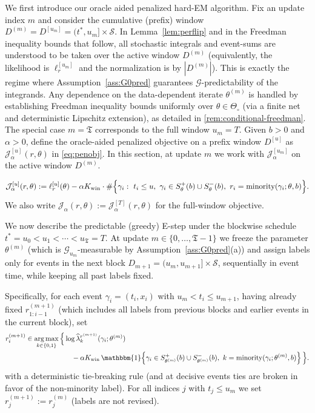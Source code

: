 \documentclass{statsoc}
\newcommand{\1}{\mathbbm{1}}
\newcommand{\Tmax}{\mathfrak{T}}
\DeclareMathOperator*{\argmax}{arg\,max}
\begin{document}
We first introduce our oracle aided penalized hard-EM algorithm. Fix an update index $m$ and consider the cumulative (prefix) window $D^{(m)}=D^{[u_m]}=(t^\ast,u_m]\times\mathcal S$. In Lemma~\ref{lem:perflip} and in the Freedman inequality bounds that follow, all stochastic integrals and event-sums are
understood to be taken over the active window $D^{(m)}$ (equivalently, the likelihood is $\ell_r^{[u_m]}$ and the
normalization is by $|D^{(m)}|$).
This is exactly the regime where Assumption~\ref{ass:G0pred} guarantees $\mathcal G$-predictability of the integrands. Any dependence on the data-dependent iterate $\theta^{(m)}$ is handled by establishing Freedman inequality bounds uniformly over $\theta\in\Theta_\circ$ (via a finite net and deterministic Lipschitz extension), as detailed in \cref{rem:conditional-freedman}. The special case $m=\Tmax$ corresponds to the full window $u_m=T$. Given $b>0$ and $\alpha>0$, define the oracle-aided penalized objective on a prefix window $D^{[u]}$ as $\mathcal J_\alpha^{[u]}(r,\theta)$ in \eqref{eq:penobj}. In this section, at update $m$ we work with $\mathcal J_\alpha^{[u_m]}$ on the active window $D^{(m)}$.


\begin{equation}\label{eq:penobj}
\mathcal J_\alpha^{[u]}(r,\theta)
:=\ell_r^{[u]}(\theta)
-\alpha K_{\rm win}\cdot
\#\Big\{\gamma_i:\ t_i\le u,\ \gamma_i\in S_\theta^+(b)\cup S_\theta^-(b),\ r_i=\text{minority}(\gamma_i;\theta,b)\Big\}.
\end{equation}
We also write $\mathcal J_\alpha(r,\theta):=\mathcal J_\alpha^{[T]}(r,\theta)$ for the full-window objective.

We now describe the predictable (greedy) E-step under the blockwise schedule
$t^\ast=u_0<u_1<\cdots<u_{\Tmax}=T$.
At update $m\in\{0,\dots,\Tmax-1\}$ we freeze the parameter $\theta^{(m)}$
(which is $\mathcal G_{u_m}$-measurable by Assumption~\ref{ass:G0pred}(a))
and assign labels only for events in the next block $D_{m+1}=(u_m,u_{m+1}]\times\mathcal S$,
sequentially in event time, while keeping all past labels fixed.

Specifically, for each event $\gamma_i=(t_i,x_i)$ with $u_m<t_i\le u_{m+1}$,
having already fixed $r^{(m+1)}_{1:i-1}$ (which includes all labels from previous blocks and earlier events in the current block),
set
\begin{align}
\label{eq:greedy-estep}
r_i^{(m+1)} \in \argmax_{k \in \{0,1\}}
\Big\{
&\log \widehat\lambda_{k}^{r^{(m+1)}}(\gamma_i;\theta^{(m)}) \nonumber\\
&\quad
-\alpha K_{\rm win}\,
\1\!\left\{
\gamma_i \in S^+_{\theta^{(m)}}(b)\cup S^-_{\theta^{(m)}}(b),\ 
k=\mathrm{minority}(\gamma_i;\theta^{(m)},b)
\right\}
\Big\}.
\end{align}
with a deterministic tie-breaking rule (and at decisive events ties are broken in favor of the non-minority label).
For all indices $j$ with $t_j\le u_m$ we set $r_j^{(m+1)}:=r_j^{(m)}$ (labels are not revised).
\end{document}
